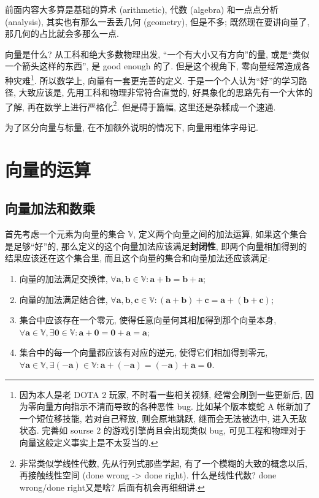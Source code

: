 前面内容大多算是基础的算术 (arithmetic), 代数 (algebra) 和一点点分析
(analysis), 其实也有那么一丢丢几何 (geometry), 但是不多;
既然现在要讲向量了, 那几何的占比就会多那么一点.

向量是什么? 从工科和绝大多数物理出发, ``一个有大小又有方向''的量,
或是``类似一个箭头这样的东西'', 是 good enough 的了. 但是这个视角下,
零向量经常造成各种灾难\footnote{因为本人是老 DOTA 2 玩家,
  不时看一些相关视频, 经常会刷到一些更新后,
  因为零向量方向指示不清而导致的各种恶性 bug. 比如某个版本蝮蛇 A
  帐新加了一个短位移技能, 若对自己释放, 则会原地跳跃, 继而会无法被选中,
  进入无敌状态. 完善如 sourse 2 的游戏引擎尚且会出现类似 bug,
  可见工程和物理对于向量这般定义事实上是不太妥当的.}. 所以数学上,
向量有一套更完善的定义. 于是一个个人认为``好''的学习路径, 大致应该是,
先用工科和物理非常符合直觉的, 好具象化的思路先有一个大体的了解,
再在数学上进行严格化\footnote{非常类似学线性代数, 先从行列式那些学起,
  有了一个模糊的大致的概念以后, 再接触线性空间 (done wrong
  -\textgreater{} done right). 什么是线性代数? done wrong/done
  right又是啥? 后面有机会再细细讲.}. 但是碍于篇幅,
这里还是杂糅成一个速通.

为了区分向量与标量, 在不加额外说明的情况下, 向量用粗体字母记.

\section{向量的运算}\label{024}

\subsection{向量加法和数乘}

首先考虑一个元素为向量的集合 $\mathbb{V}$, 定义两个向量之间的加法运算,
如果这个集合是足够``好''的,
那么定义的这个向量加法应该满足\textbf{封闭性},
即两个向量相加得到的结果应该还在这个集合里,
而且这个向量的集合和向量加法还应该满足:

\begin{enumerate}
\def\labelenumi{\arabic{enumi}.}
\item
  向量的加法满足交换律,
  $\forall\boldsymbol{a},\boldsymbol{b}\in\mathbb{V}: \boldsymbol{a}+\boldsymbol{b}=\boldsymbol{b}+\boldsymbol{a}$;
\item
  向量的加法满足结合律,
  $\forall\boldsymbol{a},\boldsymbol{b},\boldsymbol{c}\in\mathbb{V}:(\boldsymbol{a}+\boldsymbol{b})+\boldsymbol{c}=\boldsymbol{a}+(\boldsymbol{b}+\boldsymbol{c})$;
\item
  集合中应该存在一个零元, 使得任意向量何其相加得到那个向量本身,
  $\forall\boldsymbol{a}\in\mathbb{V},\exists\boldsymbol{0}\in\mathbb{V}:\boldsymbol{a}+\boldsymbol{0}=\boldsymbol{0}+\boldsymbol{a}=\boldsymbol{a}$;
\item
  集合中的每一个向量都应该有对应的逆元, 使得它们相加得到零元,
  $\forall\boldsymbol{a}\in\mathbb{V},\exists(-\boldsymbol{a})\in\mathbb{V}:\boldsymbol{a}+(-\boldsymbol{a})=(-\boldsymbol{a})+\boldsymbol{a}=\boldsymbol{0}$.
\end{enumerate}

